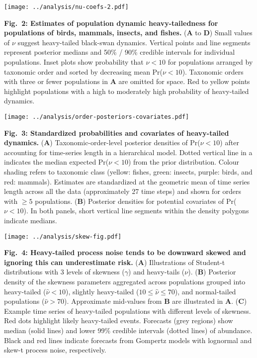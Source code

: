 \clearpage

\begin{center}
\texttt{[image: ../analysis/nu-coefs-2.pdf]}
\end{center}

\textbf{Fig.~2: Estimates of population dynamic heavy-tailedness for
populations of birds, mammals, insects, and fishes.} (\textbf{A} to \textbf{D})
Small values of \(\nu\) suggest heavy-tailed black-swan dynamics. Vertical
points and line segments represent posterior medians and 50\% / 90\% credible
intervals for individual populations. Inset plots show probability that \(\nu
< 10\) for populations arranged by taxonomic order and sorted by decreasing
mean Pr(\(\nu < 10\)). Taxonomic orders with three or fewer populations in
\textbf{A} are omitted for space. Red to yellow points highlight populations
with a high to moderately high probability of heavy-tailed dynamics.

\clearpage

\begin{center}
\texttt{[image: ../analysis/order-posteriors-covariates.pdf]}
\end{center}

\textbf{Fig.~3: Standardized probabilities and covariates of heavy-tailed
dynamics.} (\textbf{A}) Taxonomic-order-level posterior densities of Pr(\(\nu
< 10\)) after accounting for time-series length in a hierarchical model. Dotted
vertical line in a indicates the median expected Pr(\(\nu < 10\)) from the
prior distribution. Colour shading refers to taxonomic class (yellow: fishes,
green: insects, purple: birds, and red: mammals). Estimates are standardized at
the geometric mean of time series length across all the data (approximately 27
time steps) and shown for orders with \(\ge 5\) populations. (\textbf{B})
Posterior densities for potential covariates of Pr(\(\nu < 10\)). In both
panels, short vertical line segments within the density polygons indicate
medians.

\clearpage

\begin{center}
\texttt{[image: ../analysis/skew-fig.pdf]}
\end{center}

\textbf{Fig.~4: Heavy-tailed process noise tends to be downward skewed and
ignoring this can underestimate risk.} (\textbf{A}) Illustrations of Student-t
distributions with 3 levels of skewness (\(\gamma\)) and heavy-tails (\(\nu\)).
(\textbf{B}) Posterior density of the skewness parameters aggregated across
populations grouped into heavy-tailed (\(\hat{\nu} < 10\)), slightly
heavy-tailed (\(10 \leq \hat{\nu} \leq 70\)), and normal-tailed populations
(\(\hat{\nu} > 70\)). Approximate mid-values from \textbf{B} are illustrated in
\textbf{A}. (\textbf{C}) Example time series of heavy-tailed populations with
different levels of skewness. Red dots highlight likely heavy-tailed events.
Forecasts (grey regions) show median (solid lines) and lower 99\% credible
intervals (dotted lines) of abundance. Black and red lines indicate forecasts
from Gompertz models with lognormal and skew-t process noise, respectively.
